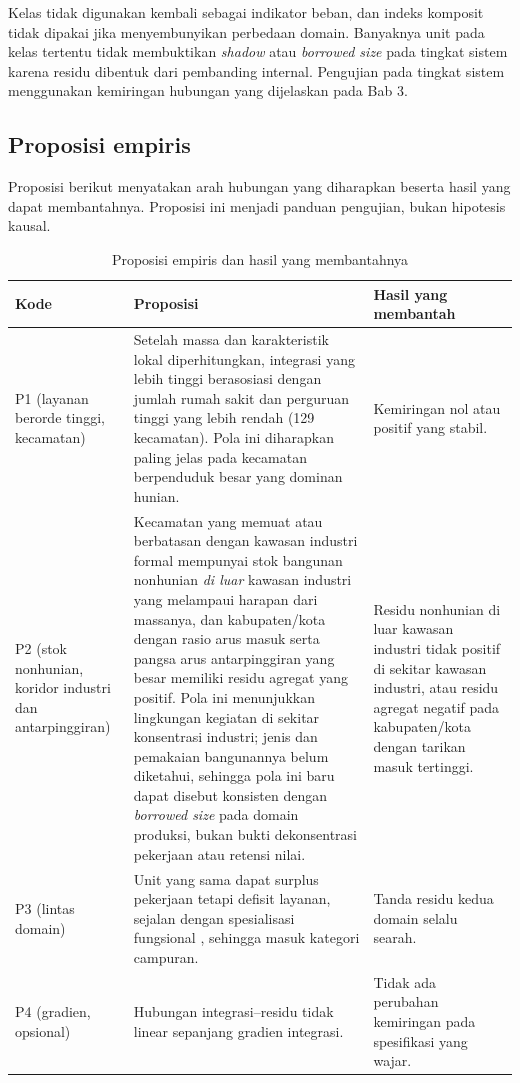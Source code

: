 \documentclass[12pt,a4paper,oneside,openany,indonesian]{report}
\begin{document}
Kelas tidak digunakan kembali sebagai indikator beban, dan indeks komposit tidak dipakai jika menyembunyikan perbedaan domain. Banyaknya unit pada kelas tertentu tidak membuktikan \textit{shadow} atau \textit{borrowed size} pada tingkat sistem karena residu dibentuk dari pembanding internal. Pengujian pada tingkat sistem menggunakan kemiringan hubungan yang dijelaskan pada Bab 3.

\subsection{Proposisi empiris}

Proposisi berikut menyatakan arah hubungan yang diharapkan beserta hasil yang dapat membantahnya. Proposisi ini menjadi panduan pengujian, bukan hipotesis kausal.

\begin{table}[H]
\centering
\footnotesize
\caption{Proposisi empiris dan hasil yang membantahnya}
\label{tab:proposisi}
\begin{tabularx}{\textwidth}{>{\raggedright\arraybackslash}p{} >{\raggedright\arraybackslash}X >{\raggedright\arraybackslash}p{}}
\toprule
\textbf{Kode} & \textbf{Proposisi} & \textbf{Hasil yang membantah}\\
\midrule
P1 (layanan berorde tinggi, kecamatan) & Setelah massa dan karakteristik lokal diperhitungkan, integrasi yang lebih tinggi berasosiasi dengan jumlah rumah sakit dan perguruan tinggi yang lebih rendah (129 kecamatan). Pola ini diharapkan paling jelas pada kecamatan berpenduduk besar yang dominan hunian. & Kemiringan nol atau positif yang stabil.\\
P2 (stok nonhunian, koridor industri dan antarpinggiran) & Kecamatan yang memuat atau berbatasan dengan kawasan industri formal mempunyai stok bangunan nonhunian \emph{di luar} kawasan industri yang melampaui harapan dari massanya, dan kabupaten/kota dengan rasio arus masuk serta pangsa arus antarpinggiran yang besar memiliki residu agregat yang positif. Pola ini menunjukkan lingkungan kegiatan di sekitar konsentrasi industri; jenis dan pemakaian bangunannya belum diketahui, sehingga pola ini baru dapat disebut konsisten dengan \textit{borrowed size} pada domain produksi, bukan bukti dekonsentrasi pekerjaan atau retensi nilai. & Residu nonhunian di luar kawasan industri tidak positif di sekitar kawasan industri, atau residu agregat negatif pada kabupaten/kota dengan tarikan masuk tertinggi.\\
P3 (lintas domain) & Unit yang sama dapat surplus pekerjaan tetapi defisit layanan, sejalan dengan spesialisasi fungsional \parencite{durantonpuga2005}, sehingga masuk kategori campuran. & Tanda residu kedua domain selalu searah.\\
P4 (gradien, opsional) & Hubungan integrasi--residu tidak linear sepanjang gradien integrasi. & Tidak ada perubahan kemiringan pada spesifikasi yang wajar.\\
\bottomrule
\end{tabularx}
\end{table}
\end{document}
